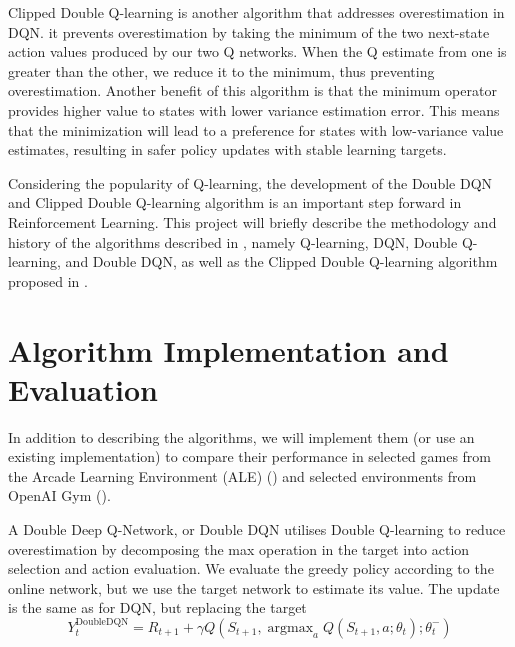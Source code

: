 \documentclass{article}
\DeclareMathOperator*{\argmax}{argmax}
\begin{document}
Clipped Double Q-learning is another algorithm that addresses overestimation in
DQN. it prevents overestimation by taking the minimum of the two next-state
action values produced by our two Q networks.  When the Q estimate from one is
greater than the other, we reduce it to the minimum, thus preventing
overestimation.  Another benefit of this algorithm is that the minimum operator
provides higher value to states with lower variance estimation error.  This
means that the minimization will lead to a preference for states with
low-variance value estimates, resulting in safer policy updates with stable
learning targets.



Considering the popularity of Q-learning, the development of the Double DQN
and Clipped Double Q-learning algorithm is an important step forward in Reinforcement Learning. 
This project will briefly describe the methodology and history of the algorithms
described in \citet{van2016deep}, namely Q-learning, DQN, Double Q-learning, and
Double DQN, as well as the Clipped Double Q-learning algorithm proposed in
\citet{fujimoto2018addressing}. 


\section{Algorithm Implementation and Evaluation}

In addition to describing the algorithms, we will implement them (or use an
existing implementation) to compare their performance in selected games from the
Arcade Learning Environment (ALE) (\citet{bellemare2013arcade}) and selected
environments from OpenAI Gym (\citet{brockman2016openai}).


A Double Deep Q-Network, or Double DQN utilises Double Q-learning to reduce
overestimation by decomposing the max operation in the target into action
selection and action evaluation. We evaluate the greedy policy according to the
online network, but we use the target network to estimate its value. The update
is the same as for DQN, but replacing the target
\[
    Y_{t}^{\text{DoubleDQN}} = R_{t+1} + \gamma Q(S_{t+1}, \argmax_a Q(S_{t+1},
    a; \theta _{t});\theta _{t}^{-})
\]
\end{document}
